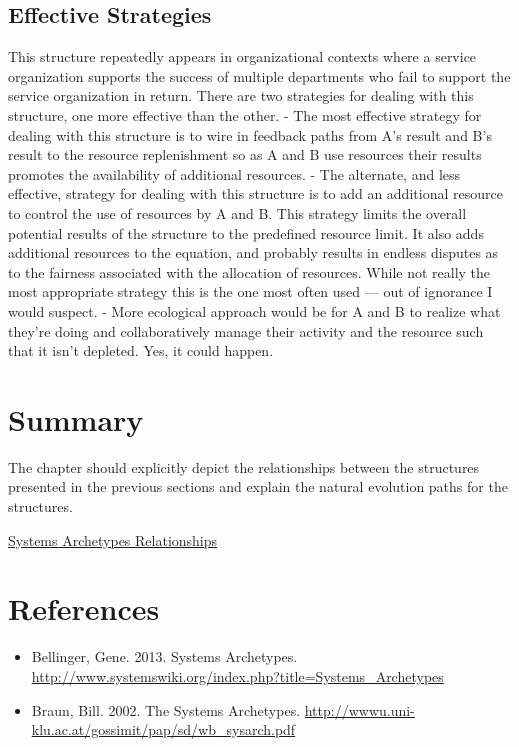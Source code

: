 \documentclass[]{memoir}
\begin{document}
\subsection{Effective Strategies}

This structure repeatedly appears in organizational contexts where a
service organization supports the success of multiple departments who
fail to support the service organization in return. There are two
strategies for dealing with this structure, one more effective than the
other. - The most effective strategy for dealing with this structure is
to wire in feedback paths from A's result and B's result to the resource
replenishment so as A and B use resources their results promotes the
availability of additional resources. - The alternate, and less
effective, strategy for dealing with this structure is to add an
additional resource to control the use of resources by A and B. This
strategy limits the overall potential results of the structure to the
predefined resource limit. It also adds additional resources to the
equation, and probably results in endless disputes as to the fairness
associated with the allocation of resources. While not really the most
appropriate strategy this is the one most often used --- out of
ignorance I would suspect. - More ecological approach would be for A and
B to realize what they're doing and collaboratively manage their
activity and the resource such that it isn't depleted. Yes, it could
happen.

\section{Summary}

The chapter should explicitly depict the relationships between the
structures presented in the previous sections and explain the natural
evolution paths for the structures.

\href{http://insightmaker.com/insight/538}{Systems Archetypes
Relationships}

\section{References}

\begin{itemize}
\itemsep1pt\parskip0pt
\item
  Bellinger, Gene. 2013. Systems Archetypes.
  \url{http://www.systemswiki.org/index.php?title=Systems_Archetypes}
\item
  Braun, Bill. 2002. The Systems Archetypes.
  \url{http://wwwu.uni-klu.ac.at/gossimit/pap/sd/wb_sysarch.pdf}
\end{itemize}
\end{document}
